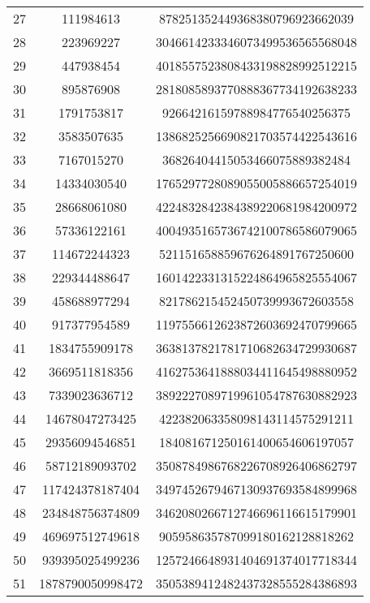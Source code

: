 \documentclass[fleqn]{article}
\begin{document}
\begin{center}
\begin{tabular}{c | c | c}
            27 & 111984613 & 878251352449368380796923662039 \\
            28 & 223969227 & 3046614233346073499536565568048 \\
            29 & 447938454 & 4018557523808433198828992512215 \\
            30 & 895876908 & 2818085893770888367734192638233 \\
            31 & 1791753817 & 92664216159788984776540256375 \\
            32 & 3583507635 & 1386825256690821703574422543616 \\
            33 & 7167015270 & 36826404415053466075889382484 \\
            34 & 14334030540 & 1765297728089055005886657254019 \\
            35 & 28668061080 & 4224832842384389220681984200972 \\
            36 & 57336122161 & 4004935165736742100786586079065 \\
            37 & 114672244323 & 521151658859676264891767250600 \\
            38 & 229344488647 & 1601422331315224864965825554067 \\
            39 & 458688977294 & 821786215452450739993672603558 \\
            40 & 917377954589 & 1197556612623872603692470799665 \\
            41 & 1834755909178 & 3638137821781710682634729930687 \\
            42 & 3669511818356 & 4162753641888034411645498880952 \\
            43 & 7339023636712 & 3892227089719961054787630882923 \\
            44 & 14678047273425 & 422382063358098143114575291211 \\
            45 & 29356094546851 & 184081671250161400654606197057 \\
            46 & 58712189093702 & 3508784986768226708926406862797 \\
            47 & 117424378187404 & 3497452679467130937693584899968 \\
            48 & 234848756374809 & 3462080266712746696116615179901 \\
            49 & 469697512749618 & 905958635787099180162128818262 \\
            50 & 939395025499236 & 1257246648931404691374017718344 \\
            51 & 1878790050998472 & 3505389412482437328555284386893 \\

\end{tabular}
\end{center}
\end{document}
